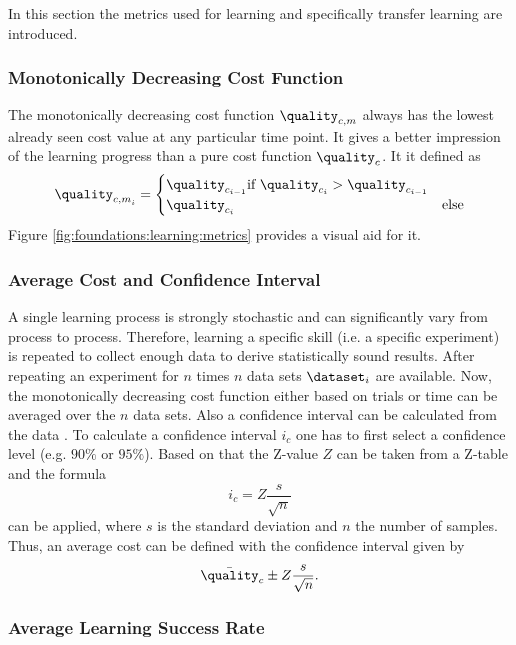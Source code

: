 In this section the metrics used for learning and specifically transfer learning are introduced.

\subsubsection{Monotonically Decreasing Cost Function}

The monotonically decreasing cost function $\quality_{c,m}$ always has the lowest already seen cost value at any particular time point.
It gives a better impression of the learning progress than a pure cost function $\quality_{c}$.
It it defined as
\begin{equation}
\quality_{{c,m}_i}=
\begin{cases}
\quality_{c_{i-1}} \text{if } \quality_{c_{i}} > \quality_{c_{i-1}} \\
\quality_{c_{i}} & \text{else}
\end{cases}
\end{equation}
Figure \ref{fig:foundations:learning:metrics} provides a visual aid for it.

\subsubsection{Average Cost and Confidence Interval}

A single learning process is strongly stochastic and can significantly vary from process to process.
Therefore, learning a specific skill (i.e. a specific experiment) is repeated to collect enough data to derive statistically sound results.
After repeating an experiment for $n$ times $n$ data sets $\dataset_i$ are available.
Now, the monotonically decreasing cost function either based on trials or time can be averaged over the $n$ data sets.
Also a confidence interval can be calculated from the data \cite{Box.1978}.
To calculate a confidence interval $i_c$ one has to first select a confidence level (e.g. $90 \%$ or $95 \%$).
Based on that the Z-value $Z$ can be taken from a Z-table and the formula
\begin{equation}
i_c = Z \frac{s}{\sqrt{n}}
\end{equation}
can be applied, where $s$ is the standard deviation and $n$ the number of samples.
Thus, an average cost can be defined with the confidence interval given by
\begin{equation}
\bar{\quality}_c \pm Z \frac{s}{\sqrt{n}}.
\end{equation}


\subsubsection{Average Learning Success Rate}

